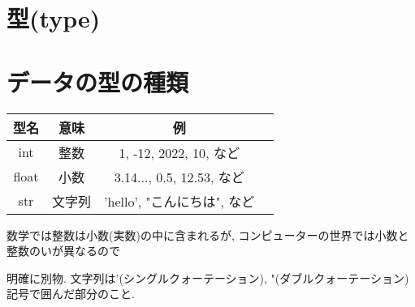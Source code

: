 \documentclass[dvipdfmx]{jsbook}
\newcommand{\countup}[1]{\setcounter{chapter}{#1} \setcounter{section}{0}}
\begin{document}
\countup{3}
\section*{型(type)}
\section{データの型の種類}
\begin{tabular}[t]{|c|c|c|c|}
	\hline
	型名  & 意味   & 例                           \\
	\hline \hline
	int   & 整数   & 1, -12, 2022, 10, など       \\ \hline
	float & 小数   & 3.14..., 0.5, 12.53, など    \\ \hline
	str   & 文字列 & 'hello',  "こんにちは", など \\ \hline
\end{tabular}
\vspace{2truemm}
\begin{screen}
	数学では整数は小数(実数)の中に含まれるが, コンピューターの世界では小数と整数のいが異なるので \par 明確に別物.
	文字列は'(シングルクォーテーション), "(ダブルクォーテーション)記号で囲んだ部分のこと.
\end{screen}
\end{document}
